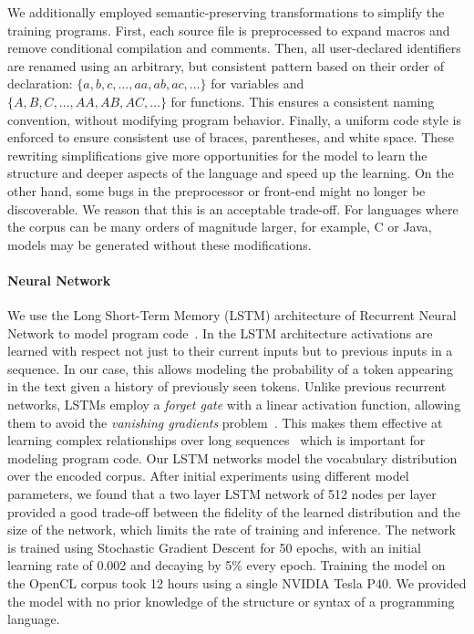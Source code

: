 We additionally employed semantic-preserving transformations to simplify the
training programs. First, each source file is preprocessed to expand macros and
remove conditional compilation and comments. Then, all user-declared identifiers
are renamed using an arbitrary, but consistent pattern based on their order of
declaration: $\{a,\allowbreak b,\allowbreak c,\allowbreak \ldots,\allowbreak
aa,\allowbreak ab,\allowbreak ac,\allowbreak \ldots\}$ for variables and
$\{A,\allowbreak B,\allowbreak C,\allowbreak \ldots,\allowbreak AA,\allowbreak
AB,\allowbreak AC,\allowbreak \ldots\}$ for functions. This ensures a consistent
naming convention, without modifying program behavior. Finally, a uniform code
style is enforced to ensure consistent use of braces, parentheses, and white
space. These rewriting simplifications give more opportunities for the model to
learn the structure and deeper aspects of the language and speed up the
learning. On the other hand, some bugs in the preprocessor or front-end might no
longer be discoverable. We reason that this is an acceptable trade-off. For
languages where the corpus can be many orders of magnitude larger, for example,
C or Java, models may be generated without these modifications.

\paragraph{Neural Network}

We use the Long Short-Term Memory (LSTM) architecture of Recurrent Neural
Network to model program code~\cite{Hochreiter1997}. In the LSTM architecture
activations are learned with respect not just to their current inputs but to
previous inputs in a sequence. In our case, this allows modeling the probability
of a token appearing in the text given a history of previously seen tokens.
Unlike previous recurrent networks, LSTMs employ a \emph{forget gate} with a
linear activation function, allowing them to avoid the \emph{vanishing
gradients} problem~\cite{Pacanu2013}. This makes them effective at learning
complex relationships over long sequences~\cite{Lipton2015} which is important
for modeling program code. Our LSTM networks model the vocabulary distribution
over the encoded corpus. After initial experiments using different model
parameters, we found that a two layer LSTM network of 512 nodes per layer
provided a good trade-off between the fidelity of the learned distribution and
the size of the network, which limits the rate of training and inference. The
network is trained using Stochastic Gradient Descent for 50 epochs, with an
initial learning rate of 0.002 and decaying by 5\% every epoch. Training the
model on the OpenCL corpus took 12 hours using a single NVIDIA Tesla P40. We
provided the model with no prior knowledge of the structure or syntax of a
programming language.

